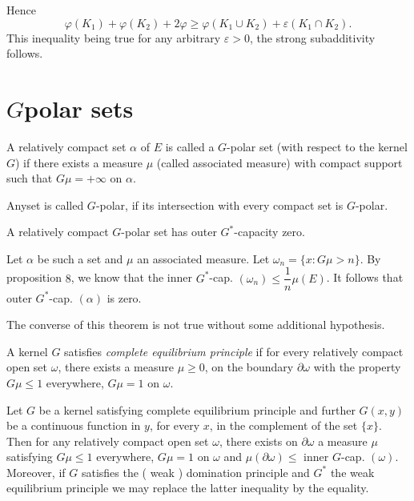 Hence
$$
\varphi (K_1) + \varphi (K_2) + 2 \varphi \geq \varphi (K_1
\cup K_2) + \varepsilon (K_1 \cap K_2). 
$$
This inequality being true for any arbitrary $ \varepsilon > 0 $, the
strong subadditivity follows. 

\section{\texorpdfstring{$G$}-polar sets}\label{p3:chap4:sec12} %

\begin{defn}\label{p3:chap4:sec12:def15} %
  A relatively compact set $\alpha $ of $E$ is called a $G$-polar
  set (with respect to the kernel $G$) if there exists a measure $\mu$
  (called associated measure) with compact support such that $ G \mu =
  + \infty $ on $ \alpha $. 
\end{defn}

Any\pageoriginale set is called $G$-polar, if its intersection with every compact
set is $G$-polar. 

\begin{thm}\label{p3:chap4:sec12:thm9} %
  A relatively compact $G$-polar set has outer $G^*$-capacity zero. 
\end{thm}

Let $\alpha$ be such a set and $\mu$ an associated measure. Let $
\omega_n = \big \{ x : G \mu > n \big \} $. By proposition $8$, we
know that the inner  $G^*$-cap. $ ( \omega_n ) \leq \dfrac{1}{n} \mu
(E) $. It follows that outer $G^*$-cap. $(\alpha)$ is zero. 

The converse of this  theorem is not true without some additional hypothesis. 

\begin{defn}\label{p3:chap4:sec12:def16} %
  A kernel $G$ satisfies  {\em complete equilibrium principle } if for
  every relatively compact open set $\omega$, there exists a measure
  $\mu \geq 0$, on the boundary $\partial \omega$ with the property  $
  G \mu \leq 1 $ everywhere, $ G \mu = 1 $ on $ \omega $. 
\end{defn}

\begin{prop}\label{p3:chap4:sec12:prop12} %
  Let $G$ be a kernel satisfying complete equilibrium  principle and
  further $G (x,y)$ be a continuous function in $y$, for every $x$, in
  the complement of the set $ \big\{ x \big\} $. Then for any
  relatively compact open set $\omega$, there exists on $\partial
  \omega$ a measure  $\mu$ satisfying $ G \mu \leq 1 $ everywhere,  $G
  \mu = 1 $ on $\omega$ and $ \mu ( \partial \omega ) \leq $ inner
  $G$-cap. $ (\omega) $. Moreover, if $G$ satisfies the ( weak )
  domination principle and $G^*$ the weak equilibrium principle we may
  replace the latter inequality by the equality.  
\end{prop}

